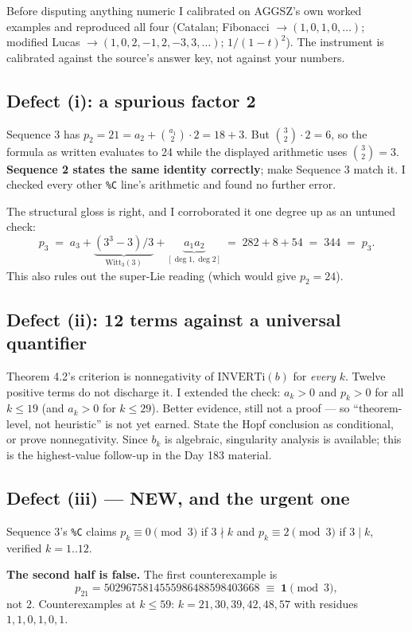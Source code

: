 \documentclass[11pt]{article}
\newcommand{\code}[1]{\texttt{#1}}
\begin{document}
Before disputing anything numeric I calibrated on AGGSZ's own worked examples and
reproduced all four (Catalan; Fibonacci $\to(1,0,1,0,\dots)$; modified Lucas
$\to(1,0,2,-1,2,-3,3,\dots)$; $1/(1-t)^2$). The instrument is calibrated against
the source's answer key, not against your numbers.

\subsection{Defect (i): a spurious factor 2}
Sequence 3 has $p_2=21=a_2+\binom{a_1}{2}\cdot 2=18+3$. But
$\binom{3}{2}\cdot2=6$, so the formula as written evaluates to 24 while the
displayed arithmetic uses $\binom32=3$. \textbf{Sequence 2 states the same
identity correctly}; make Sequence 3 match it. I checked every other \code{\%C}
line's arithmetic and found no further error.

The structural gloss is right, and I corroborated it one degree up as an untuned
check:
\[ p_3 \;=\; a_3+\underbrace{(3^3-3)/3}_{\mathrm{Witt}_3(3)}+\underbrace{a_1a_2}_{[\deg1,\deg2]}\;=\;282+8+54\;=\;344\;=\;p_3 .\]
This also rules out the super-Lie reading (which would give $p_2=24$).

\subsection{Defect (ii): 12 terms against a universal quantifier}
Theorem 4.2's criterion is nonnegativity of $\mathrm{INVERTi}(b)$ for
\emph{every} $k$. Twelve positive terms do not discharge it. I extended the check:
$a_k>0$ and $p_k>0$ for all $k\le 19$ (and $a_k>0$ for $k\le29$). Better evidence,
still not a proof --- so ``theorem-level, not heuristic'' is not yet earned.
State the Hopf conclusion as conditional, or prove nonnegativity. Since $b_k$ is
algebraic, singularity analysis is available; this is the highest-value follow-up
in the Day 183 material.

\subsection{Defect (iii) --- NEW, and the urgent one}
Sequence 3's \code{\%C} claims $p_k\equiv 0 \pmod 3$ if $3\nmid k$ and
$p_k\equiv 2\pmod 3$ if $3\mid k$, verified $k=1..12$.

\textbf{The second half is false.} The first counterexample is
\[ p_{21}=5029675814555986488598403668\;\equiv\;\mathbf{1}\pmod 3,\]
not 2. Counterexamples at $k\le59$: $k=21,30,39,42,48,57$ with residues
$1,1,0,1,0,1$.
\end{document}
